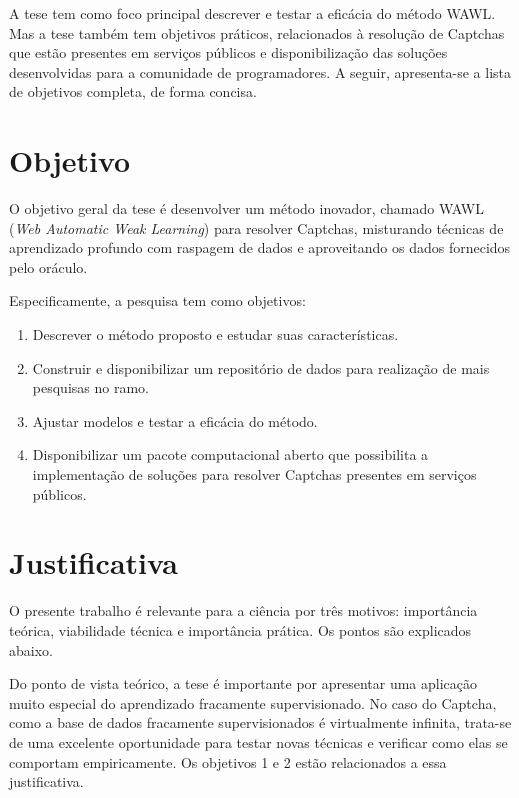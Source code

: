 \documentclass[12pt,twoside,brazilian]{book}
\providecommand{\tightlist}{%
  \setlength{\itemsep}{0pt}\setlength{\parskip}{0pt}}
\begin{document}
A tese tem como foco principal descrever e testar a eficácia do método
WAWL. Mas a tese também tem objetivos práticos, relacionados à resolução
de Captchas que estão presentes em serviços públicos e disponibilização
das soluções desenvolvidas para a comunidade de programadores. A seguir,
apresenta-se a lista de objetivos completa, de forma concisa.

\hypertarget{sec-objetivos}{%
\section{Objetivo}\label{sec-objetivos}}

O objetivo geral da tese é desenvolver um método inovador, chamado WAWL
(\emph{Web Automatic Weak Learning}) para resolver Captchas, misturando
técnicas de aprendizado profundo com raspagem de dados e aproveitando os
dados fornecidos pelo oráculo.

Especificamente, a pesquisa tem como objetivos:

\begin{enumerate}
\def\labelenumi{\arabic{enumi}.}
\tightlist
\item
  Descrever o método proposto e estudar suas características.
\item
  Construir e disponibilizar um repositório de dados para realização de
  mais pesquisas no ramo.
\item
  Ajustar modelos e testar a eficácia do método.
\item
  Disponibilizar um pacote computacional aberto que possibilita a
  implementação de soluções para resolver Captchas presentes em serviços
  públicos.
\end{enumerate}

\hypertarget{sec-justificativa}{%
\section{Justificativa}\label{sec-justificativa}}

O presente trabalho é relevante para a ciência por três motivos:
importância teórica, viabilidade técnica e importância prática. Os
pontos são explicados abaixo.

Do ponto de vista teórico, a tese é importante por apresentar uma
aplicação muito especial do aprendizado fracamente supervisionado. No
caso do Captcha, como a base de dados fracamente supervisionados é
virtualmente infinita, trata-se de uma excelente oportunidade para
testar novas técnicas e verificar como elas se comportam empiricamente.
Os objetivos 1 e 2 estão relacionados a essa justificativa.
\end{document}
